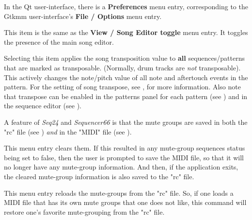    \setcounter{ItemCounter}{0}      %

   In the Qt user-interface, there is a \textbf{Preferences} menu entry,
   corresponding to the Gtkmm user-interface's \textbf{File / Options}
   menu entry.

   This item is the same as the 
   \textbf{View / Song Editor toggle} menu entry.  It toggles the presence of
   the main song editor.

   Selecting this item applies the song transposition value to
   \textbf{all} sequences/patterns that are marked as transposable.
   (Normally, drum tracks are \textsl{not} transposable).
   This actively changes the note/pitch value of all note and aftertouch events
   in the pattern.
   For the setting of song transpose, see
   , for more information.
   Also note that transpose can be enabled in the patterns panel for each
   pattern (see ) and
   in the sequence editor
   (see ).

   A feature of \textsl{Seq24} and \textsl{Sequencer66} is that the mute groups
   are saved in both the "rc" file
   (see )
   \textsl{and} in the "MIDI" file
   (see ).

   This menu entry clears them. If this resulted in any mute-group sequences
   status being set to false, then the user is prompted to save the MIDI
   file, so that it will no longer have any
   mute-group information.  And then, if the
   application exits, the cleared mute-group information is also saved to
   the "rc" file.

   This menu entry reloads the mute-groups from the "rc" file.
   So, if one loads a MIDI file that has its own mute groups that one does not
   like, this command will restore one's favorite mute-grouping from the "rc"
   file.

